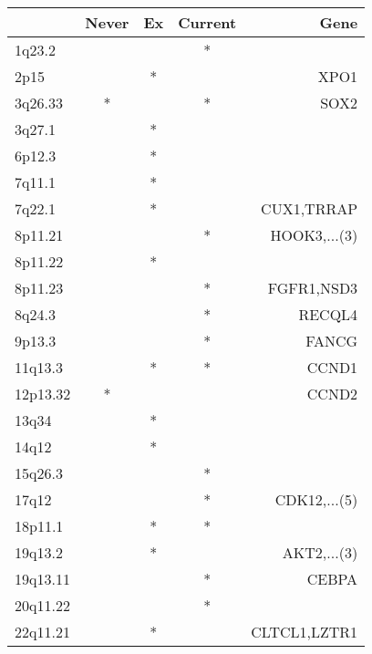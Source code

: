 \begin{tabular}{lcccr}
\toprule
{} & Never & Ex & Current &          Gene \\
\midrule
1q23.2   &       &    &       * &               \\
2p15     &       &  * &         &          XPO1 \\
3q26.33  &     * &    &       * &          SOX2 \\
3q27.1   &       &  * &         &               \\
6p12.3   &       &  * &         &               \\
7q11.1   &       &  * &         &               \\
7q22.1   &       &  * &         &    CUX1,TRRAP \\
8p11.21  &       &    &       * &  HOOK3,...(3) \\
8p11.22  &       &  * &         &               \\
8p11.23  &       &    &       * &    FGFR1,NSD3 \\
8q24.3   &       &    &       * &        RECQL4 \\
9p13.3   &       &    &       * &         FANCG \\
11q13.3  &       &  * &       * &         CCND1 \\
12p13.32 &     * &    &         &         CCND2 \\
13q34    &       &  * &         &               \\
14q12    &       &  * &         &               \\
15q26.3  &       &    &       * &               \\
17q12    &       &    &       * &  CDK12,...(5) \\
18p11.1  &       &  * &       * &               \\
19q13.2  &       &  * &         &   AKT2,...(3) \\
19q13.11 &       &    &       * &         CEBPA \\
20q11.22 &       &    &       * &               \\
22q11.21 &       &  * &         &  CLTCL1,LZTR1 \\
\bottomrule
\end{tabular}
